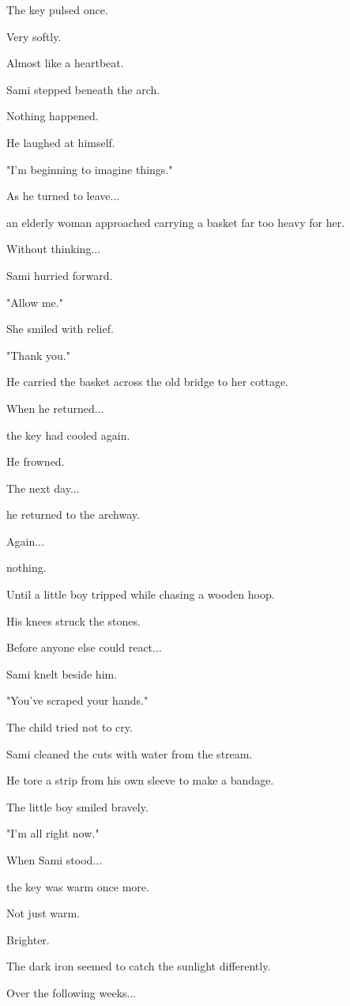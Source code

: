 \documentclass[12pt,openany]{book}
\begin{document}
The key pulsed once.

Very softly.

Almost like a heartbeat.

Sami stepped beneath the arch.

Nothing happened.

He laughed at himself.

"I'm beginning to imagine things."

As he turned to leave...

an elderly woman approached carrying a basket far too heavy for her.

Without thinking...

Sami hurried forward.

"Allow me."

She smiled with relief.

"Thank you."

He carried the basket across the old bridge to her cottage.

When he returned...

the key had cooled again.

He frowned.

The next day...

he returned to the archway.

Again...

nothing.

Until a little boy tripped while chasing a wooden hoop.

His knees struck the stones.

Before anyone else could react...

Sami knelt beside him.

"You've scraped your hands."

The child tried not to cry.

Sami cleaned the cuts with water from the stream.

He tore a strip from his own sleeve to make a bandage.

The little boy smiled bravely.

"I'm all right now."

When Sami stood...

the key was warm once more.

Not just warm.

Brighter.

The dark iron seemed to catch the sunlight differently.

Over the following weeks...
\end{document}

